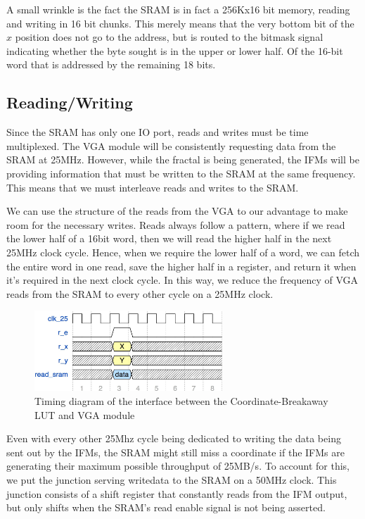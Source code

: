 \documentclass{article}
\begin{document}
A small wrinkle is the fact the SRAM is in fact a 256Kx16 bit memory,
reading and writing in 16 bit chunks. This merely means that the very
bottom bit of the $x$ position does not go to the address, but is
routed to the bitmask signal indicating whether the byte sought is in the upper or lower half.
Of the 16-bit word that is addressed by the remaining 18 bits.

\subsection{Reading/Writing}

Since the SRAM has only one IO port, reads and writes must be time
multiplexed. The VGA module will be consistently requesting data from the SRAM at 25MHz. However, while 
the fractal is being generated, the IFMs will be providing information that must be written to the SRAM 
at the same frequency. This means that we must interleave reads and writes to the SRAM.

We can use the structure of the reads from the VGA to our
advantage to make room for the necessary writes. Reads always follow a pattern, where
if we read the lower half of a 16bit word, then we will read the
higher half in the next 25MHz clock cycle. Hence, when we require the lower
half of a word, we can fetch the entire word in one read, save the
higher half in a register, and return it when it's required in
the next clock cycle. In this way, we reduce the frequency of VGA reads from the SRAM to every other cycle on a 
25MHz clock.

\begin{figure}[H]
  \centering
    \includegraphics[width=200pt]{timing_diagrams/clut_vga.pdf}
  \caption{Timing diagram of the interface between the Coordinate-Breakaway LUT and VGA module}
\end{figure}

Even with every other 25Mhz cycle being dedicated to writing the data being sent out by the IFMs, the SRAM might
still miss a coordinate if the IFMs are generating their maximum possible throughput of 25MB/s. To account for this, 
we put the junction serving writedata to the SRAM on a 50MHz clock. This junction consists of a shift register that 
constantly reads from the IFM output, but only shifts when the SRAM's read enable signal is not being asserted. 
\end{document}
